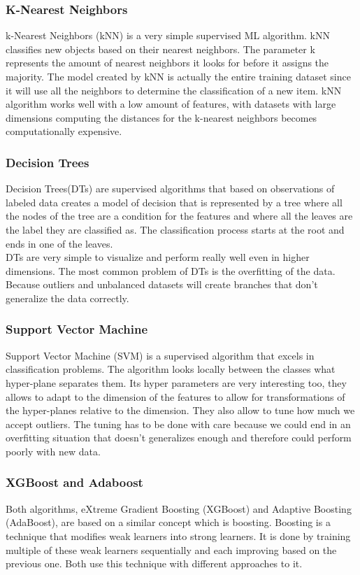 \subsubsection{K-Nearest Neighbors}
k-Nearest Neighbors (kNN) is a very simple supervised ML algorithm. kNN classifies new objects based on their nearest neighbors. The parameter k represents the amount of nearest neighbors it looks for before it assigns the majority. The model created by kNN is actually the entire training dataset since it will use all the neighbors to determine the classification of a new item. kNN algorithm works well with a low amount of features, with datasets with large dimensions computing the distances for the k-nearest neighbors becomes computationally expensive.

\subsubsection{Decision Trees}
Decision Trees(DTs) are supervised algorithms that based on observations of labeled data creates a model of decision that is represented by a tree where all the nodes of the tree are a condition for the features and where all the leaves are the label they are classified as. The classification process starts at the root and ends in one of the leaves.\\
DTs are very simple to visualize and perform really well even in higher dimensions. The most common problem of DTs is the overfitting of the data. Because outliers and unbalanced datasets will create branches that don't generalize the data correctly.

\subsubsection{Support Vector Machine}
Support Vector Machine (SVM) is a supervised algorithm that excels in classification problems. The algorithm looks locally between the classes what hyper-plane separates them. 
Its hyper parameters are very interesting too, they allows to adapt to the dimension of the features to allow for transformations of the hyper-planes relative to the dimension. They also allow to tune how much we accept outliers. The tuning has to be done with care because we could end in an overfitting situation that doesn't generalizes enough and therefore could perform poorly with new data.

\subsubsection{XGBoost and Adaboost}
Both algorithms, eXtreme Gradient Boosting (XGBoost) and Adaptive Boosting (AdaBoost), are based on a similar concept which is boosting. Boosting is a technique that modifies weak learners into strong learners. It is done by training multiple of these weak learners sequentially and each improving based on the previous one.\cite{boosting} Both use this technique with different approaches to it.

